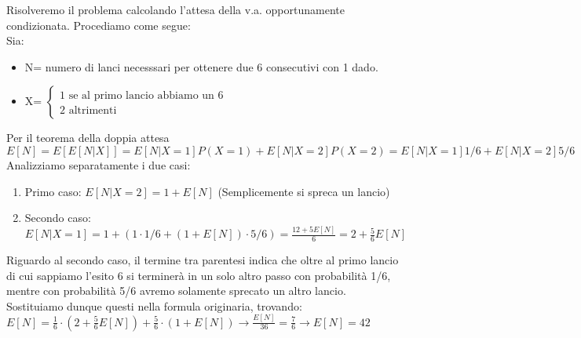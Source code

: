 \documentclass{oxmathproblems}
\begin{document}
\begin{questions}
\begin{solution}
    Risolveremo il problema calcolando l'attesa della v.a. opportunamente condizionata. Procediamo come segue:\\
    Sia:
    \begin{itemize}
        \item N= numero di lanci necesssari per ottenere due 6 consecutivi con 1 dado.
        \item X= 
        $\begin{cases}
            \text{1 se al primo lancio abbiamo un 6}\\
            \text{2 altrimenti}
        \end{cases}$
    \end{itemize}
    Per il teorema della doppia attesa $E[N]=E[E[N|X]]=E[N|X=1]P(X=1)+E[N|X=2]P(X=2)=E[N|X=1]1/6+E[N|X=2]5/6$\\
    Analizziamo separatamente i due casi:
    \begin{enumerate}
        \item Primo caso: $E[N|X=2]=1+E[N]$ (Semplicemente si spreca un lancio)
        \item Secondo caso: $E[N|X=1]=1+(1\cdot1/6+(1+E[N])\cdot5/6)=\frac{12+5E[N]}{6}=2+\frac{5}{6}E[N]$
    \end{enumerate}
    Riguardo al secondo caso, il termine tra parentesi indica che oltre al primo lancio di cui sappiamo l'esito 6 si terminerà in un solo altro passo con probabilità 1/6, mentre con probabilità 5/6 avremo solamente sprecato un altro lancio.\\
    Sostituiamo dunque questi nella formula originaria, trovando:\\ 
    $E[N]=\frac{1}{6}\cdot (2+\frac{5}{6}E[N])+\frac{5}{6}\cdot(1 + E[N])\longrightarrow \frac{E[N]}{36}=\frac{7}{6} \longrightarrow E[N]=42$
\end{solution}

\end{questions}
\end{document}
